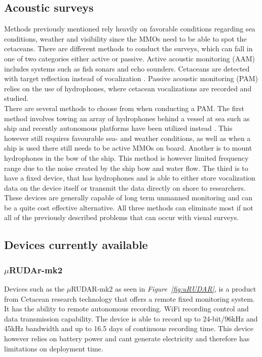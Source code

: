\subsection{Acoustic surveys}

Methods previously mentioned rely heavily on favorable conditions regarding sea conditions, weather and visibility since the MMOs need to be able to spot the cetaceans.
There are different methods to conduct the surveys, which can fall in one of two categories either active or passive.
Active acoustic monitoring (AAM) includes systems such as fish sonars and echo sounders. 
Cetaceans are detected with target reflection instead of vocalization \cite{pyc_evaluation_2015}.
Passive acoustic monitoring (PAM) relies on the use of hydrophones, where cetacean vocalizations are recorded and studied.\\
\indent There are several methods to choose from when conducting a PAM.
The first method involves towing an array of hydrophones behind a vessel at sea such as ship and recently autonomous platforms have been utilized instead\cite{baumgartner_diel_2008} .
This however still requires favourable sea- and weather conditions, as well as when a ship is used there still needs to be active MMOs on board.
Another is to mount hydrophones in the bow of the ship.
This method is however limited frequency range due to the noise created by the ship bow and water flow\cite{rankin_acoustic_2008}.
The third is to have a fixed device, that has hydrophones and is able to either store vocalization data on the device itself or transmit the data directly on shore to researchers.
These devices are generally capable of long term unmanned monitoring and can be a quite cost effective alternative.
All three methods can eliminate most if not all of the previously described problems that can occur with visual surveys.



\subsection{Devices currently available}
\subsubsection{$\mu$RUDAr-mk2}

Devices such as the $\mu$RUDAR-mk2 as seen in \textit{Figure~\ref{fig:uRUDAR}}, is a product from Cetacean research technology that offers a remote fixed monitoring system.
It has the ability to remote autonomous recording.
WiFi recording control and data transmission capability.
The device is able to record up to 24-bit/96kHz and 45kHz bandwidth and up to 16.5 days of continuous recording time\cite{computing_microrudar_nodate}.
This device however relies on battery power and cant generate electricity and therefore has limitations on deployment time.

